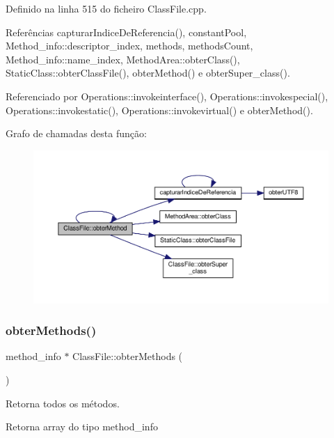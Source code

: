 Definido na linha 515 do ficheiro Class\+File.\+cpp.



Referências capturar\+Indice\+De\+Referencia(), constant\+Pool, Method\+\_\+info\+::descriptor\+\_\+index, methods, methods\+Count, Method\+\_\+info\+::name\+\_\+index, Method\+Area\+::obter\+Class(), Static\+Class\+::obter\+Class\+File(), obter\+Method() e obter\+Super\+\_\+class().



Referenciado por Operations\+::invokeinterface(), Operations\+::invokespecial(), Operations\+::invokestatic(), Operations\+::invokevirtual() e obter\+Method().

Grafo de chamadas desta função\+:\nopagebreak
\begin{figure}[H]
\begin{center}
\leavevmode
\includegraphics[width=350pt]{classClassFile_aac49e7e39f677987b53fdf15787b8106_cgraph}
\end{center}
\end{figure}
\mbox{\label{classClassFile_a6ecce8d87f74c84b07f102c0298de13a}} 
\subsubsection{\texorpdfstring{obter\+Methods()}{obterMethods()}}
{\footnotesize\ttfamily method\+\_\+info $\ast$ Class\+File\+::obter\+Methods (\begin{DoxyParamCaption}{ }\end{DoxyParamCaption})}



Retorna todos os métodos. 

\begin{DoxyReturn}{Retorna}
array do tipo method\+\_\+info 
\end{DoxyReturn}


